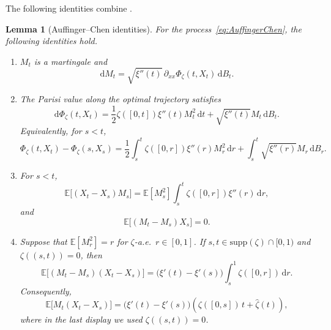 \documentclass[a4paper,10pt,reqno]{amsart}
\numberwithin{equation}{section}
\newtheorem{lemma}[proposition]{Lemma}%
\newcommand{\dE}{\mathbb{E}}%
\newcommand{\supp}{\mathrm{supp}}
\newcommand{\dd}{\mathrm{d}}
\begin{document}
	The following identities combine
	\cite[Lemmas~B.1 and~B.4]{TAPIsing}.
	\begin{lemma}[Auffinger--Chen identities]\label{lem:AC-identities}
		For the process~\eqref{eq:AuffingerChen}, the following identities hold.
		\begin{enumerate}[label=\textup{(\roman*)}]
			\item $M_t$ is a martingale and
			\begin{equation}\label{eq:AC-martingale-differential}
				\dd M_t
				=\sqrt{\xi''(t)}\,\partial_{xx}\Phi_\zeta(t,X_t)\,\dd B_t .
			\end{equation}
			
			\item The Parisi value along the optimal trajectory satisfies
			\begin{equation}\label{eq:AC-ito-phi}
				\dd\Phi_\zeta(t,X_t)
				=\frac12\zeta([0,t])\xi''(t)M_t^2\,\dd t
				+\sqrt{\xi''(t)}M_t\,\dd B_t .
			\end{equation}
			Equivalently, for $s<t$,
			\begin{equation}\label{eq:AC-ito-phi-integrated}
				\Phi_\zeta(t,X_t)-\Phi_\zeta(s,X_s)
				=\frac12\int_s^t\zeta([0,r])\xi''(r)M_r^2\,\dd r
				+\int_s^t\sqrt{\xi''(r)}M_r\,\dd B_r .
			\end{equation}
			
			\item For $s<t$,
			\begin{equation}\label{eq:AC-basic-ward-a}
				\dE\bigl[(X_t-X_s)M_s\bigr]
				=\dE[M_s^2]\int_s^t\zeta([0,r])\xi''(r)\,\dd r,
			\end{equation}
			and
			\begin{equation}\label{eq:AC-basic-ward-b}
				\dE\bigl[(M_t-M_s)X_s\bigr]=0 .
			\end{equation}
			
			\item Suppose that
			\(\dE[M_r^2]=r\) for \(\zeta\)-a.e.\ \(r\in[0,1]\).
			If \(s,t\in\supp(\zeta)\cap[0,1)\) and
			\(\zeta((s,t))=0\), then
			\begin{equation}\label{eq:AC-deltaM-deltaX}
				\dE\bigl[(M_t-M_s)(X_t-X_s)\bigr]
				=\bigl(\xi'(t)-\xi'(s)\bigr)\int_s^1\zeta([0,r])\,\dd r .
			\end{equation}
			Consequently,
			\begin{equation}\label{eq:AC-ward-contact-form}
				\dE\bigl[M_t(X_t-X_s)\bigr]
				=\bigl(\xi'(t)-\xi'(s)\bigr)
				\left(\zeta([0,s])\,t+\widehat\zeta(t)\right),
			\end{equation}
			where in the last display we used $\zeta((s,t))=0$.
		\end{enumerate}
	\end{lemma}
	
\end{document}

